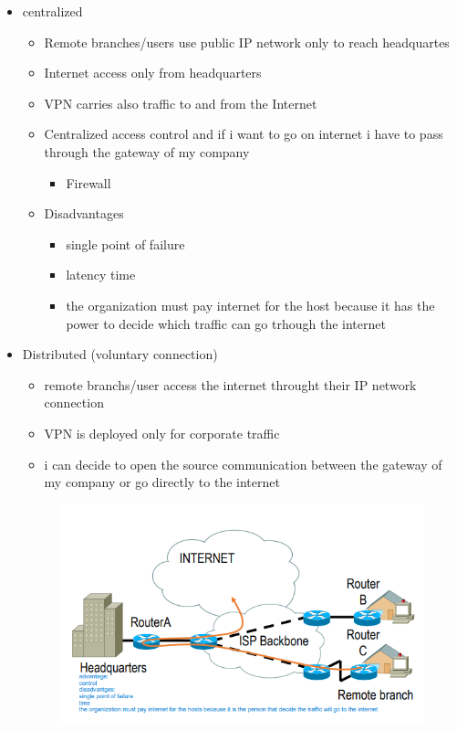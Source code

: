 \documentclass{article}
\begin{document}
\begin{itemize}
\begin{itemize}
        \item centralized
        \begin{itemize}
            \item Remote branches/users use public IP network only to reach headquartes
            \item Internet access only from headquarters
            \item VPN carries also traffic to and from the Internet
            \item Centralized access control and if i want to go on internet i have to pass through the gateway of my company
            \begin{itemize}
                \item Firewall 
            \end{itemize}
            \item Disadvantages
            \begin{itemize}
                \item single point of failure
                \item latency time
                \item the organization must pay internet for the host because it has the power to decide which traffic can go trhough the internet
            \end{itemize}
        \end{itemize}
        \item Distributed (voluntary connection)
        \begin{itemize}
            \item remote branchs/user access the internet throught their IP network connection
            \item VPN is deployed only for corporate traffic
            \item i can decide to open the source communication between the gateway of my company or go directly to the internet
        \end{itemize}
        \begin{figure}[h]
            \centering
            \begin{minipage}[b]{0.45\textwidth}
                \centering
                \includegraphics[width=\textwidth]{figure/centralized_VPN.png}

\end{minipage}
\end{figure}
\end{itemize}
\end{itemize}
\end{document}
